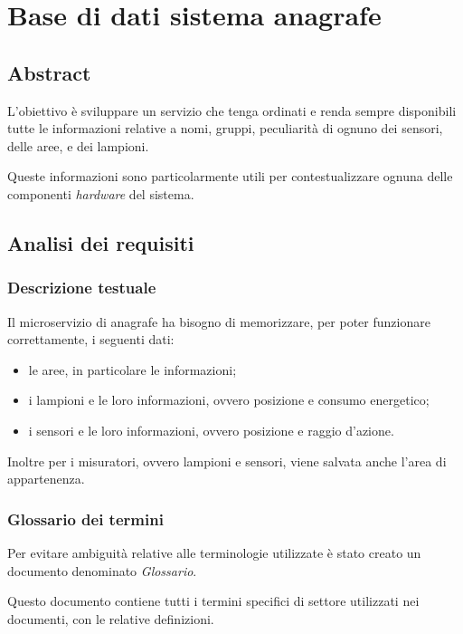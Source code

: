\section{Base di dati sistema anagrafe}

\subsection{Abstract}

L'obiettivo è sviluppare un servizio che tenga ordinati e renda sempre disponibili tutte le informazioni relative a nomi, gruppi, peculiarità di ognuno dei sensori, delle aree, e dei lampioni. 

Queste informazioni sono particolarmente utili per contestualizzare ognuna delle componenti {\it{hardware}} del sistema.

\subsection{Analisi dei requisiti}

\subsubsection{Descrizione testuale}

Il microservizio di anagrafe ha bisogno di memorizzare, per poter funzionare correttamente, i seguenti dati:

\begin{itemize}
    \item le aree, in particolare le informazioni;
    \item i lampioni e le loro informazioni, ovvero posizione e consumo energetico;
    \item i sensori e le loro informazioni, ovvero posizione e raggio d'azione.
\end{itemize}

Inoltre per i misuratori, ovvero lampioni e sensori, viene salvata anche l'area di appartenenza.

\subsubsection{Glossario dei termini}

Per evitare ambiguità relative alle terminologie utilizzate è stato creato un documento denominato \textit{Glossario}.

Questo documento contiene tutti i termini specifici di settore utilizzati nei documenti, con le relative definizioni.

